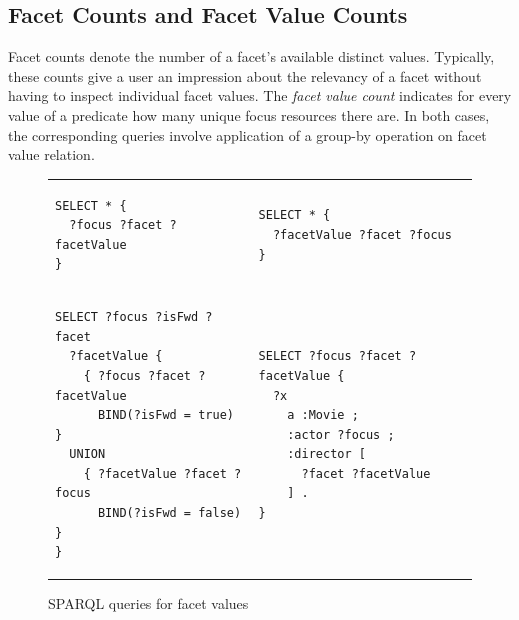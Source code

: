 \subsection{Facet Counts and Facet Value Counts}
Facet counts denote the number of a facet's available distinct values. Typically, these counts give a user an impression about the relevancy of a
facet without having to inspect individual facet values.
The \emph{facet value count} indicates for every value of a predicate
how many unique focus resources there are.
In both cases, the corresponding queries involve application of a group-by operation on facet
value relation.%







\begin{figure}
\centering
\bgroup
\def\arraystretch{1.5}
\begin{tabular}{m{8cm}m{8cm}}
\begin{lstlisting}[language=sparql, label=lst:simple-facet, linewidth=7cm, caption=Forward facets]
SELECT * {
  ?focus ?facet ?facetValue
}
\end{lstlisting}

&

\begin{lstlisting}[language=sparql, linewidth=7cm, caption=Backward facets]
SELECT * {
  ?facetValue ?facet ?focus
}
\end{lstlisting}

\\

\begin{lstlisting}[language=sparql, linewidth=7cm, caption=Union of both directions (not supported)]
SELECT ?focus ?isFwd ?facet
  ?facetValue {
    { ?focus ?facet ?facetValue
      BIND(?isFwd = true) }
  UNION
    { ?facetValue ?facet ?focus
      BIND(?isFwd = false) }
}
\end{lstlisting}


&

\begin{lstlisting}[language=sparql, linewidth=7cm, caption=Example where the ?focus variable is in a different triple pattern than ?facet and ?facetValue.]
SELECT ?focus ?facet ?facetValue {
  ?x
    a :Movie ;
    :actor ?focus ;
    :director [
      ?facet ?facetValue
    ] .
}
\end{lstlisting}

\\

\end{tabular}
\egroup
\caption{SPARQL queries for facet values}
\label{fig:simple-facet-value}
\end{figure}




